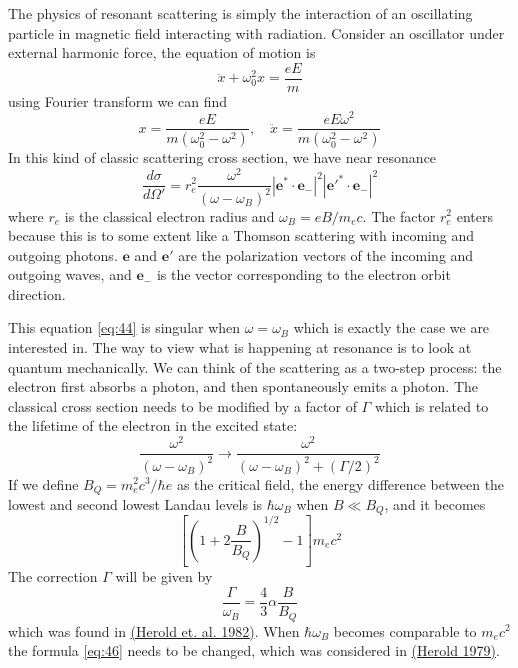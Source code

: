 \documentclass[letterpaper, 11pt]{article}
\numberwithin{equation}{section}
\numberwithin{figure}{section}
\begin{document}
The physics of resonant scattering is simply the interaction of an oscillating particle in magnetic field interacting with radiation. Consider an oscillator under external harmonic force, the equation of motion is
\begin{equation}
    \label{eq:42}
    \ddot{x} + \omega_0^2x = \frac{eE}{m}
\end{equation}
using Fourier transform we can find
\begin{equation}
    \label{eq:43}
    x = \frac{eE}{m(\omega_0^2 - \omega^2)}, \quad \ddot{x} = \frac{eE\omega^2}{m(\omega_0^2 - \omega^2)}
\end{equation}
In this kind of classic scattering cross section, we have near resonance
\begin{equation}
    \label{eq:44}
    \frac{d\sigma}{d\Omega'} = r_e^2\frac{\omega^2}{(\omega - \omega_B)^2} \left| \boldsymbol{e}^{*}\cdot \boldsymbol{e}_- \right|^2 \left| \boldsymbol{e}'^{*}\cdot \boldsymbol{e}_- \right|^2
\end{equation}
where $r_e$ is the classical electron radius and $\omega_B = eB/m_ec$. The factor $r_e^2$ enters because this is to some extent like a Thomson scattering with incoming and outgoing photons.
$\boldsymbol{e}$ and $\boldsymbol{e}'$ are the polarization vectors of the incoming and outgoing waves, and $\boldsymbol{e}_-$ is the vector corresponding to the electron orbit direction.

This equation \eqref{eq:44} is singular when $\omega = \omega_B$ which is exactly the case we are interested in. The way to view what is happening at resonance is to look at quantum mechanically. We can think of the scattering as a two-step process: the electron first absorbs a photon, and then spontaneously emits a photon. The classical cross section needs to be modified by a factor of $\Gamma$ which is related to the lifetime of the electron in the excited state:
\begin{equation}
    \label{eq:46}
    \frac{\omega^2}{(\omega - \omega_B)^2} \longrightarrow \frac{\omega^2}{(\omega - \omega_B)^2 + (\Gamma/2)^2}
\end{equation}
If we define $B_Q = m_e^2c^3/\hbar e$ as the critical field, the energy difference between the lowest and second lowest Landau levels is $\hbar\omega_B$ when $B\ll B_Q$, and it becomes
\begin{equation}
    \label{eq:45}
    \left[ \left( 1 + 2\frac{B}{B_Q} \right)^{1/2} - 1  \right] m_ec^2
\end{equation}
The correction $\Gamma$ will be given by
\begin{equation}
    \label{eq:47}
    \frac{\Gamma}{\omega_B} = \frac{4}{3}\alpha\frac{B}{B_Q}
\end{equation}
which was found in \href{http://adsabs.harvard.edu/abs/1982A%26A...115...90H}{(Herold et. al. 1982)}. When $\hbar\omega_B$ becomes comparable to $m_ec^2$ the formula \eqref{eq:46} needs to be changed, which was considered in \href{http://adsabs.harvard.edu/abs/1979PhRvD..19.2868H}{(Herold 1979)}.
\end{document}

